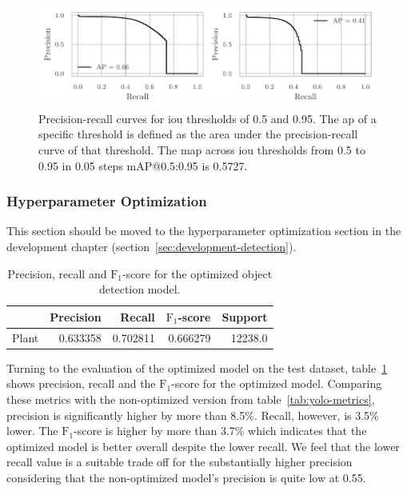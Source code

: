 \documentclass[draft,final]{vutinfth} %
\begin{document}
\begin{figure}
  \centering
  \includegraphics{graphics/APpt5-pt95.pdf}
  \caption[Object detection AP@0.5 and AP@0.95.]{Precision-recall
    curves for \gls{iou} thresholds of 0.5 and 0.95. The \gls{ap} of a
    specific threshold is defined as the area under the
    precision-recall curve of that threshold. The \gls{map} across
    \gls{iou} thresholds from 0.5 to 0.95 in 0.05 steps
    \textsf{mAP}@0.5:0.95 is 0.5727.}
  \label{fig:yolo-ap}
\end{figure}

\subsubsection{Hyperparameter Optimization}
\label{sssec:yolo-hyp-opt}

This section should be moved to the hyperparameter optimization
section in the development chapter
(section~\ref{sec:development-detection}).


\begin{table}[h]
  \centering
  \begin{tabular}{lrrrr}
    \toprule
    {} &  Precision &    Recall &  $\mathrm{F}_1$-score &  Support \\
    \midrule
    Plant        &   0.633358 &  0.702811 &  0.666279 &  12238.0 \\
    \bottomrule
  \end{tabular}
  \caption{Precision, recall and $\mathrm{F}_1$-score for the
    optimized object detection model.}
  \label{tab:yolo-metrics-hyp}
\end{table}

Turning to the evaluation of the optimized model on the test dataset,
table~\ref{tab:yolo-metrics-hyp} shows precision, recall and the
$\mathrm{F}_1$-score for the optimized model. Comparing these metrics
with the non-optimized version from table~\ref{tab:yolo-metrics},
precision is significantly higher by more than 8.5\%. Recall, however,
is 3.5\% lower. The $\mathrm{F}_1$-score is higher by more than 3.7\%
which indicates that the optimized model is better overall despite the
lower recall. We feel that the lower recall value is a suitable trade
off for the substantially higher precision considering that the
non-optimized model's precision is quite low at 0.55.
\end{document}

